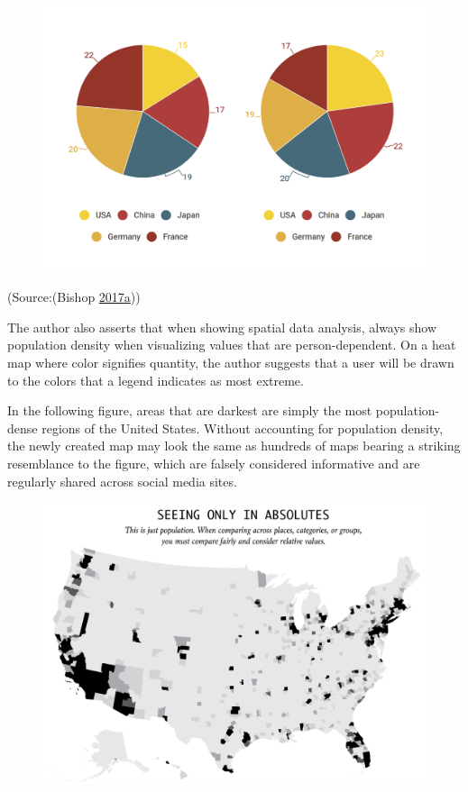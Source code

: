 \documentclass[]{book}
\theoremstyle{definition}
\theoremstyle{definition}
\theoremstyle{definition}
\theoremstyle{remark}
\begin{document}
\begin{figure}
\centering
\includegraphics{images/PieCharts.png}
\caption{}
\end{figure}

(Source:(Bishop
\protect\hyperlink{ref-visual-lies}{2017}\protect\hyperlink{ref-visual-lies}{a}))

The author also asserts that when showing spatial data analysis, always
show population density when visualizing values that are
person-dependent. On a heat map where color signifies quantity, the
author suggests that a user will be drawn to the colors that a legend
indicates as most extreme.

In the following figure, areas that are darkest are simply the most
population-dense regions of the United States. Without accounting for
population density, the newly created map may look the same as hundreds
of maps bearing a striking resemblance to the figure, which are falsely
considered informative and are regularly shared across social media
sites.

\begin{figure}
\centering
\includegraphics{images/Maps1.png}
\caption{}
\end{figure}
\end{document}
